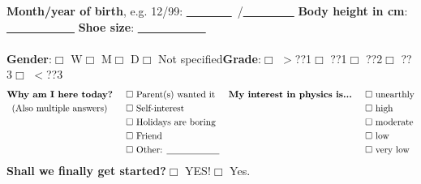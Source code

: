 \textbf{Month/year of birth}, \textsf{e.g. 12/99}: \underline{~~~~~~~~}~/\underline{~~~~~~~~~}\hspace{1cm} \textbf{Body height in cm}: \underline{~~~~~~~~~~~~}\hspace{1cm} \textbf{Shoe size}: \underline{~~~~~~~~~~~~} \\ 
\vspace{0.2cm}\\
\textbf{Gender}:\hspace{0.4cm}$\Box$ W\hspace{0.5cm}$\Box$ M\hspace{0.5cm}$\Box$ D\hspace{0.5cm}$\Box$ Not specified\hspace{1cm}\textbf{Grade}:\hspace{0.5cm}$\Box$ $>$??1\hspace{0.5cm}$\Box$ ??1\hspace{0.5cm}$\Box$ ??2\hspace{0.5cm}$\Box$ ??3\hspace{0.5cm}$\Box$ $<$??3 \\
\begin{align*}
\textmd{\textbf{Why am I here today?}}   \hspace{0.5cm}& \Box \textmd{ Parent(s) wanted it} &\textmd{\textbf{My interest in physics is...}}  \hspace{0.5cm}& \Box \textmd{ unearthly}\\
\textmd{(Also multiple answers)}   \hspace{0.7cm}&\Box \textmd{ Self-interest} && \Box \textmd{ high}\\
    &\Box \textmd{ Holidays are boring} && \Box \textmd{ moderate}\\
    &\Box \textmd{ Friend} && \Box \textmd{ low}\\
    &\Box \textmd{ Other: \underline{\hspace{2cm}}} && \Box \textmd{ very low}
\end{align*}
\textbf{Shall we finally get started?}\hspace{0.5cm}$\Box$ YES!\hspace{0.5cm}$\Box$ Yes. \newline

